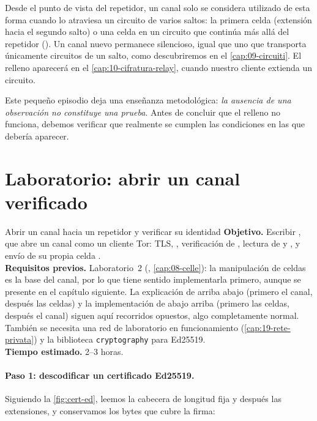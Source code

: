 Desde el punto de vista del repetidor, un canal solo se considera utilizado de esta forma cuando lo atraviesa un circuito de varios saltos: la primera celda  (extensión hacia el segundo salto) o una celda  en un circuito que continúa más allá del repetidor (). Un canal nuevo permanece silencioso, igual que uno que transporta únicamente circuitos de un salto, como descubriremos en el \cref{cap:09-circuiti}. El relleno aparecerá en el \cref{cap:10-cifratura-relay}, cuando nuestro cliente extienda un circuito.

Este pequeño episodio deja una enseñanza metodológica: \emph{la ausencia de una observación no constituye una prueba}. Antes de concluir que el relleno no funciona, debemos verificar que realmente se cumplen las condiciones en las que debería aparecer.

\section{Laboratorio: abrir un canal verificado}\label{sec:lab-canale}

\begin{laboratorio}[1]{Abrir un canal hacia un repetidor y verificar su identidad}
\textbf{Objetivo.} Escribir , que abre un canal como un cliente Tor: TLS, , verificación de , lectura de  y , y envío de su propia celda .\\
\textbf{Requisitos previos.} Laboratorio~2 (, \cref{cap:08-celle}): la manipulación de celdas es la base del canal, por lo que tiene sentido implementarla primero, aunque se presente en el capítulo siguiente. La explicación de arriba abajo (primero el canal, después las celdas) y la implementación de abajo arriba (primero las celdas, después el canal) siguen aquí recorridos opuestos, algo completamente normal. También se necesita una red de laboratorio en funcionamiento (\cref{cap:19-rete-privata}) y la biblioteca \texttt{cryptography} para Ed25519.\\
\textbf{Tiempo estimado.} 2--3 horas.
\end{laboratorio}

\paragraph{Paso 1: descodificar un certificado Ed25519.} Siguiendo la \cref{fig:cert-ed}, leemos la cabecera de longitud fija y después las extensiones, y conservamos los bytes que cubre la firma:

